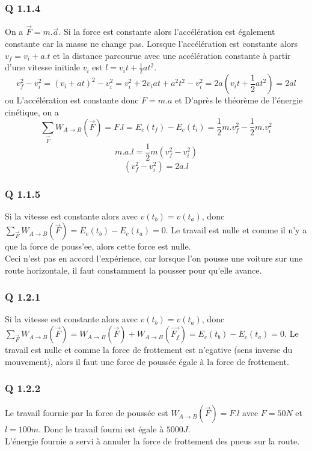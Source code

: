 \documentclass[]{book}
\theoremstyle{definition}
\begin{document}
\subsubsection*{Q 1.1.4}
On a $\overrightarrow{F} = m.\overrightarrow{a}$. Si la force est constante alors l'acc\'el\'eration est \'egalement constante car la masse ne change pas. Lorsque l'acc\'el\'eration est constante alors $v_f = v_i + a.t$ et la distance parcourue avec une acc\'el\'eration constante \`a partir d'une vitesse initiale $v_i$ est $l=v_it+\frac{1}{2}at^2$.
$$v_f^2 - v_i^2 = (v_i + at)^2 - v_i^2 = v_i^2 + 2 v_iat + a^2t^2 - v_i^2 = 2a(v_it + \frac{1}{2}at^2) = 2al$$
ou
L'acc\'el\'eration est constante donc $F = m.a$ et D'apr\`es le th\'eor\`eme de l'\'energie cin\'etique, on a
$$\sum_{\overrightarrow{F}}W_{A \to B}(\overrightarrow{F}) = F.l = E_c(t_f) - E_c(t_i) = \frac{1}{2}m.v_f^2 - \frac{1}{2}m.v_i^2$$
$$m.a.l = \frac{1}{2}m(v_f^2 - v_i^2)$$
$$(v_f^2 - v_i^2) = 2a.l$$


\subsubsection*{Q 1.1.5}
Si la vitesse est constante alors avec $v(t_b) = v(t_a)$, donc $\sum_{\overrightarrow{F}}W_{A \to B}(\overrightarrow{F}) = E_c(t_b) - E_c(t_a) = 0$. Le travail est nulle et comme il n'y a que la force de pouss'ee, alors cette force est nulle.\\

Ceci n'est pas en accord l'exp\'erience, car lorsque l'on pousse une voiture sur une route horizontale, il faut constamment la pousser pour qu'elle avance. 

\subsubsection*{Q 1.2.1}
Si la vitesse est constante alors avec $v(t_b) = v(t_a)$, donc $\sum_{\overrightarrow{F}}W_{A \to B}(\overrightarrow{F}) = W_{A \to B}(\overrightarrow{F}) + W_{A \to B}(\overrightarrow{F_f}) = E_c(t_b) - E_c(t_a) = 0$. Le travail est nulle et comme la force de frottement est n'egative (sens inverse du mouvement), alors il faut une force de pouss\'ee \'egale \`a la force de frottement.\\

\subsubsection*{Q 1.2.2}
Le travail fournie par la force de pouss\'ee est $W_{A \to B}(\overrightarrow{F}) = F.l$ avec $F = 50N$ et $l=100m$. Donc le travail fourni est \'egale \`a $5000J$.\\
L'\'energie fournie a servi \`a annuler la force de frottement des pneus sur la route.
\end{document}
